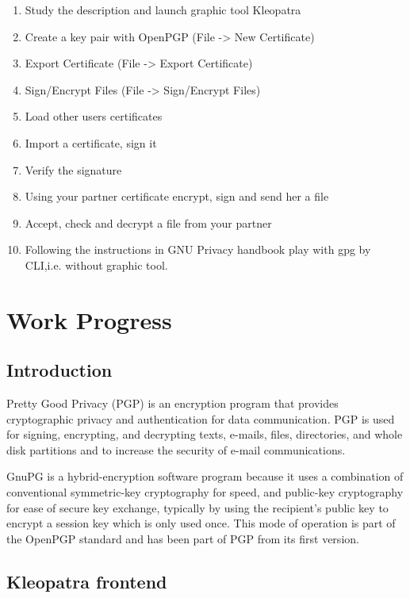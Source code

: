 \documentclass[14pt,a4paper,report]{report}
\begin{document}
\begin{enumerate}
	\item Study the description and launch graphic tool Kleopatra
	\item Create a key pair with OpenPGP (File -> New Certificate)
	\item Export Certificate (File -> Export Certificate)
	\item Sign/Encrypt Files (File -> Sign/Encrypt Files)
	\item Load other users certificates
	\item Import a certificate, sign it
	\item Verify the signature
	\item Using your partner certificate encrypt, sign and send her a file
	\item Accept, check and decrypt a file from your partner
	\item Following the instructions in GNU Privacy handbook play with gpg by CLI,i.e. without graphic tool.
\end{enumerate}

\clearpage

\section{Work Progress}

\subsection{Introduction}

Pretty Good Privacy (PGP) is an encryption program that provides cryptographic privacy and authentication for data communication. PGP is used for signing, encrypting, and decrypting texts, e-mails, files, directories, and whole disk partitions and to increase the security of e-mail communications.

GnuPG is a hybrid-encryption software program because it uses a combination of conventional symmetric-key cryptography for speed, and public-key cryptography for ease of secure key exchange, typically by using the recipient's public key to encrypt a session key which is only used once. This mode of operation is part of the OpenPGP standard and has been part of PGP from its first version.

\subsection{Kleopatra frontend}
\end{document}
